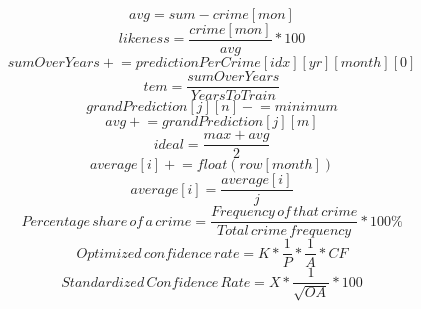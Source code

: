 \documentclass{article}
\begin{document}
\[avg = sum - crime[mon]\] \newline
\[likeness = \frac{crime[mon]}{avg}*100\] \newline
\[sumOverYears \mathrel{+}= predictionPerCrime[idx][yr][month][0]\] \newline
\[tem = \frac{sumOverYears}{YearsToTrain}\] \newline
\[grandPrediction[j][n] \mathrel{-}= minimum\] \newline
\[avg \mathrel{+}= grandPrediction[j][m]\] \newline
\[ideal = \frac{max+avg}{2}\] \newline
\[average[i] \mathrel{+}= float(row[month])\] \newline
\[average[i] = \frac{average[i]}{j}\] \newline
\[Percentage\,share\,of\,a\,crime = \frac{Frequency\,of\,that\,crime}{Total\,crime\,frequency} * 100 \text{\%}\] \newline
\[Optimized\,confidence\,rate = K * \frac{1}{P} * \frac{1}{A} * CF\]
\[Standardized\,Confidence\,Rate = X * \frac{1}{\sqrt{OA}} * 100\]
\end{document}
